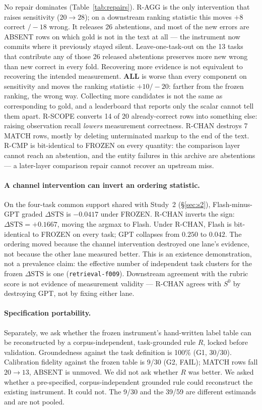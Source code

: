 \documentclass[sigconf,anonymous]{aamas}
\newcommand{\task}[1]{\texttt{#1}}
\newcommand{\STS}{\mathrm{STS}}
\begin{document}
No repair dominates (Table~\ref{tab:repairs}).
R-AGG is the only intervention that raises sensitivity ($20\to28$); on a downstream ranking statistic this moves $+8$ correct $/-18$ wrong.
It releases 26 abstentions, and most of the new errors are ABSENT rows on which gold is not in the text at all --- the instrument now commits where it previously stayed silent.
Leave-one-task-out on the 13 tasks that contribute any of those 26 released abstentions preserves more new wrong than new correct in every fold.
Recovering more evidence is not equivalent to recovering the intended measurement.
\textbf{ALL} is worse than every component on sensitivity and moves the ranking statistic $+10/-20$: farther from the frozen ranking, the wrong way.
Collecting more candidates is not the same as corresponding to gold, and a leaderboard that reports only the scalar cannot tell them apart.
R-SCOPE converts 14 of 20 already-correct rows into something else: raising observation recall \emph{lowers} measurement correctness.
R-CHAN destroys 7 MATCH rows, mostly by deleting unterminated markup to the end of the text.
R-CMP is bit-identical to FROZEN on every quantity: the comparison layer cannot reach an abstention, and the entity failures in this archive are abstentions --- a later-layer comparison repair cannot recover an upstream miss.

\paragraph{A channel intervention can invert an ordering statistic.}
On the four-task common support shared with Study~2 (\S\ref{sec:s2}), Flash-minus-GPT graded $\Delta\STS$ is $-0.0417$ under FROZEN.
R-CHAN inverts the sign: $\Delta\STS=+0.1667$, moving the argmax to Flash.
Under R-CHAN, Flash is bit-identical to FROZEN on every task; GPT collapses from $0.250$ to $0.042$.
The ordering moved because the channel intervention destroyed one lane's evidence, not because the other lane measured better.
This is an existence demonstration, not a prevalence claim: the effective number of independent task clusters for the frozen $\Delta\STS$ is one (\task{retrieval-f009}).
Downstream agreement with the rubric score is not evidence of measurement validity --- R-CHAN agrees with $S^{0}$ by destroying GPT, not by fixing either lane.

\paragraph{Specification portability.}
Separately, we ask whether the frozen instrument's hand-written label table can be reconstructed by a corpus-independent, task-grounded rule $R$, locked before validation.
Groundedness against the task definition is 100\% (G1, $30/30$).
Calibration fidelity against the frozen table is 9/30 (G2, FAIL); MATCH rows fall $20\to13$, ABSENT is unmoved.
We did not ask whether $R$ was better.
We asked whether a pre-specified, corpus-independent grounded rule could reconstruct the existing instrument.
It could not.
The 9/30 and the 39/59 are different estimands and are not pooled.
\end{document}
